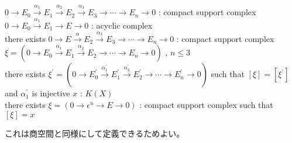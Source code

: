 \documentclass[dvipdfmx]{jsarticle}
\begin{document}
\begin{Theorem}
\itemprop
  \For \(0 \to E_0 \overset{\alpha_1}{\to} E_1 \overset{\alpha_2}{\to} E_2 \overset{\alpha_3}{\to} E_3 \to \cdots \to E_n \to 0\) : compact support complex \\
  \For \(0 \to E_0 \overset{\alpha_1}{\to} E_1 \to E \to 0\) : acyclic complex \\
  \Then there exists \(0 \to E \overset{\alpha}{\to} E_2 \overset{\alpha_3}{\to} E_3 \to \cdots \to E_n \to 0\) : compact support complex
\itemprop
  \For \(\xi = (0 \to E_0 \overset{\alpha_1}{\to} E_1 \overset{\alpha_2}{\to} E_2 \to \cdots \to E_n \to 0)\) , \(n \leq 3\) \\
  \Then there exists \(\xi^\prime = (0 \to E^\prime_0 \overset{\alpha^\prime_1}{\to} E^\prime_1 \overset{\alpha^\prime_2}{\to} E^\prime_2 \to \cdots \to E^\prime_n \to 0)\) such that \([\xi] = [\xi^\prime]\) and \(\alpha^\prime_1\) is injective
\itemprop
  \For \(x\) : \(K(X)\) \\
  \Then there exists \(\xi = (0 \to \epsilon^n \to E \to 0)\) : compact support complex such that \([\xi] = x\)
\end{Theorem}

\begin{Proof}
\itemprof
  これは商空間と同様にして定義できるためよい。
\end{Proof}
\end{document}
